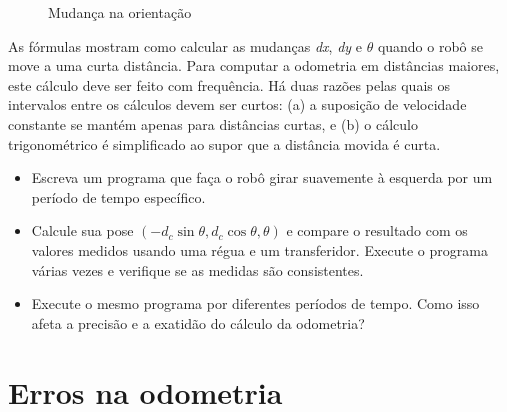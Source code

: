 \begin{figure}
\begin{center}
\end{center}
\caption{Mudança na orientação}\label{fig.heading}
\end{figure}

As fórmulas mostram como calcular as mudanças \textit{dx}, \textit{dy} e $\theta$ quando o robô se move a uma curta distância. Para computar a odometria em distâncias maiores, este cálculo deve ser feito com frequência. Há duas razões pelas quais os intervalos entre os cálculos devem ser curtos: (a) a suposição de velocidade constante se mantém apenas para distâncias curtas, e (b) o cálculo trigonométrico é simplificado ao supor que a distância movida é curta.

\begin{framed}
\begin{itemize}
\item Escreva um programa que faça o robô girar suavemente à esquerda por um período de tempo específico.
\item Calcule sua pose $( - d_c \sin \theta, d_c \cos \theta, \theta)$ e compare o resultado com os valores medidos usando uma régua e um transferidor. Execute o programa várias vezes e verifique se as medidas são consistentes.
\item Execute o mesmo programa por diferentes períodos de tempo. Como isso afeta a precisão e a exatidão do cálculo da odometria?
\end{itemize}
\end{framed}

\section{Erros na odometria}\label{s.odometry-errors}

